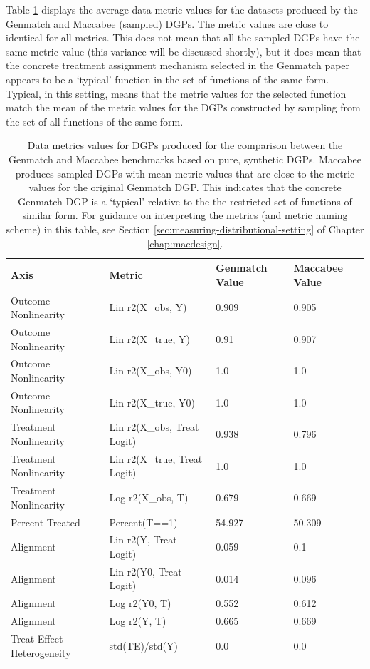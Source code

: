 \documentclass[../main.tex]{subfiles}
\begin{document}
Table \ref{tbl:pure-synth-data-metrics-1} displays the average data metric values for the datasets produced by the Genmatch and Maccabee (sampled) DGPs. The metric values are close to identical for all metrics. This does not mean that all the sampled DGPs have the same metric value (this variance will be discussed shortly), but it does mean that the concrete treatment assignment mechanism selected in the Genmatch paper appears to be a `typical' function in the set of functions of the same form. Typical, in this setting, means that the metric values for the selected function match the mean of the metric values for the DGPs constructed by sampling from the set of all functions of the same form.


\begin{table}[ht!]
\centering
    \begin{tabular}{|l|l|m{1.5cm}|m{1.5cm}|}
    \hline
    \rowcolor[HTML]{EFEFEF} 
    Axis & Metric & Genmatch Value & Maccabee Value \\ \hline
    Outcome Nonlinearity & Lin r2(X\_obs, Y) & 0.909 & 0.905 \\ \hline
    Outcome Nonlinearity & Lin r2(X\_true, Y) & 0.91 & 0.907 \\ \hline
    Outcome Nonlinearity & Lin r2(X\_obs, Y0) & 1.0 & 1.0 \\ \hline
    Outcome Nonlinearity & Lin r2(X\_true, Y0) & 1.0 & 1.0 \\ \hline
    Treatment Nonlinearity & Lin r2(X\_obs, Treat Logit) & 0.938 & 0.796 \\ \hline
    Treatment Nonlinearity & Lin r2(X\_true, Treat Logit) & 1.0 & 1.0 \\ \hline
    Treatment Nonlinearity & Log r2(X\_obs, T) & 0.679 & 0.669 \\ \hline
    Percent Treated & Percent(T==1) & 54.927 & 50.309 \\ \hline
    Alignment & Lin r2(Y, Treat Logit) & 0.059 & 0.1 \\ \hline
    Alignment & Lin r2(Y0, Treat Logit) & 0.014 & 0.096 \\ \hline
    Alignment & Log r2(Y0, T) & 0.552 & 0.612 \\ \hline
    Alignment & Log r2(Y, T) & 0.665 & 0.669 \\ \hline
    Treat Effect Heterogeneity & std(TE)/std(Y) & 0.0 & 0.0 \\ \hline
    \end{tabular}
    \caption{Data metrics values for DGPs produced for the comparison between the Genmatch and Maccabee benchmarks based on pure, synthetic DGPs. Maccabee produces sampled DGPs with mean metric values that are close to the metric values for the original Genmatch DGP. This indicates that the concrete Genmatch DGP is a `typical' relative to the the restricted set of functions of similar form. For guidance on interpreting the metrics (and metric naming scheme) in this table, see Section \ref{sec:measuring-distributional-setting} of Chapter \ref{chap:macdesign}.}
    \label{tbl:pure-synth-data-metrics-1}
\end{table}
\FloatBarrier
\end{document}
